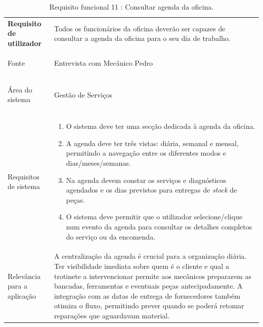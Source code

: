 \documentclass[a4paper,12pt]{scrreprt}
\begin{document}
\begin{table}[H]
    \centering
    \renewcommand{\arraystretch}{1.5} 
    
    \begin{tabular}{|>{\columncolor{gray!15}\bfseries}p{4cm}|p{10.5cm}|}
        \hline
        Requisito de utilizador & Todos os funcionários da oficina deverão ser capazes de consultar a agenda da oficina para o seu dia de trabalho.\\ \hdashline
        
        Fonte & Entrevista com Mecânico Pedro \\ \hdashline
        
        Área do sistema & Gestão de Serviços \\ \hdashline
        
        Requisitos de sistema & 
        \begin{enumerate}[leftmargin=*, nosep, topsep=2pt, partopsep=0pt]
       
            \item O sistema deve ter uma secção dedicada à agenda da oficina.
            \item A agenda deve ter três vistas: diária, semanal e mensal, permitindo a navegação entre os diferentes modos e dias/meses/semanas.
            \item Na agenda devem constar os serviços e diagnósticos agendados e os dias previstos para entregas de \textit{stock} de peças.
            \item O sistema deve permitir que o utilizador selecione/clique num evento da agenda para consultar os detalhes completos do serviço ou da encomenda.
        \end{enumerate} \\ \hdashline
        
        Relevância para a aplicação & A centralização da agenda é crucial para a organização diária. Ter visibilidade imediata sobre quem é o cliente e qual a trotinete a intervencionar permite aos mecânicos prepararem as bancadas, ferramentas e eventuais peças antecipadamente. A integração com as datas de entrega de fornecedores também otimiza o fluxo, permitindo prever quando se poderá retomar reparações que aguardavam material.\\ \hline
    \end{tabular}
    \caption{Requisito funcional 11 : Consultar agenda da oficina.}
    \label{tab:rf_consultar_agenda}
\end{table}
\end{document}
